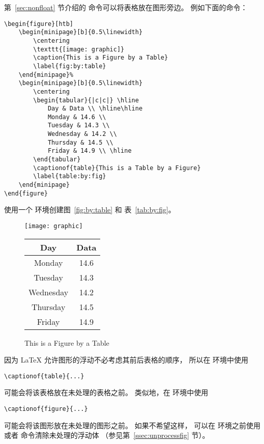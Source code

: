第~\ref{sec:nonfloat} 节介绍的  命令可以将表格放在图形旁边。
例如下面的命令：
\begin{lstlisting}
\begin{figure}[htb]
	\begin{minipage}[b]{0.5\linewidth}
		\centering
		\texttt{[image: graphic]}
		\caption{This is a Figure by a Table}
		\label{fig:by:table}
	\end{minipage}%
	\begin{minipage}[b]{0.5\linewidth}
		\centering
		\begin{tabular}{|c|c|} \hline
			Day & Data \\ \hline\hline
			Monday & 14.6 \\
			Tuesday & 14.3 \\
			Wednesday & 14.2 \\
			Thursday & 14.5 \\
			Friday & 14.9 \\ \hline
		\end{tabular}
		\captionof{table}{This is a Table by a Figure}
		\label{table:by:fig}
	\end{minipage}
\end{figure}
\end{lstlisting}
使用一个  环境创建图~\ref{fig:by:table} 和 表~\ref{tab:by:fig}。

\begin{figure}[htb]
	\begin{minipage}[b]{0.5\linewidth}
		\centering
		\texttt{[image: graphic]}
		\caption{This is a Figure by a Table}
		\label{fig:by:table}
	\end{minipage}%
	\begin{minipage}[b]{0.5\linewidth}
		\centering
		\begin{tabular}{|c|c|} \hline
			Day & Data \\ \hline\hline
			Monday & 14.6 \\
			Tuesday & 14.3 \\
			Wednesday & 14.2 \\
			Thursday & 14.5 \\
			Friday & 14.9 \\ \hline
		\end{tabular}
		\label{table:by:fig}
	\end{minipage}
\end{figure}

因为 \LaTeX{} 允许图形的浮动不必考虑其前后表格的顺序，
所以在  环境中使用
\begin{lstlisting}
\captionof{table}{...}
\end{lstlisting}
可能会将该表格放在未处理的表格之前。
类似地，在  环境中使用
\begin{lstlisting}
\captionof{figure}{...}
\end{lstlisting}
可能会将该图形放在未处理的图形之前。
如果不希望这样，
可以在  环境之前使用  或者  命令清除未处理的浮动体
（参见第~\ref{ssec:unprocessfig} 节）。


